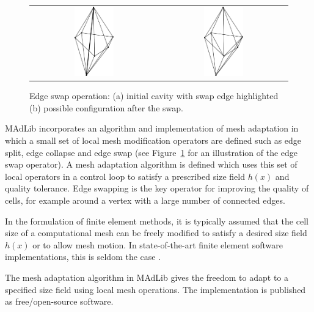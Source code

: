 \begin{figure}
\begin{center}
\begin{tabular}{cc}
\centering
\includegraphics[height=3cm,width=6cm]{chapters/hoffman-2/pdf/swap.pdf} &
\hspace{0.3cm}
\includegraphics[height=3cm,width=6cm]{chapters/hoffman-2/pdf/swap_config1.pdf}
\end{tabular}
\end{center}
\caption{Edge swap operation: (a) initial cavity with swap edge
highlighted (b) possible configuration after the swap.}
\label{fig:op:eswap}
\end{figure}

MAdLib incorporates an algorithm and implementation of mesh adaptation
in which a small set of local mesh modification operators are defined
such as edge split, edge collapse and edge swap (see
Figure~\ref{fig:op:eswap} for an illustration of the edge swap
operator). A mesh adaptation algorithm is defined which uses this set
of local operators in a control loop to satisfy a prescribed size
field $h(x)$ and quality tolerance. Edge swapping is the key operator
for improving the quality of cells, for example around a vertex with a
large number of connected edges.

In the formulation of finite element methods, it is typically assumed
that the cell size of a computational mesh can be freely modified to
satisfy a desired size field $h(x)$ or to allow mesh motion. In
state-of-the-art finite element software implementations, this is
seldom the case \citep{BangerthHartmannKanschat2007, COMSOL2009}.

The mesh adaptation algorithm in MAdLib gives the freedom to adapt to
a specified size field using local mesh operations. The implementation
is published as free/open-source software.


